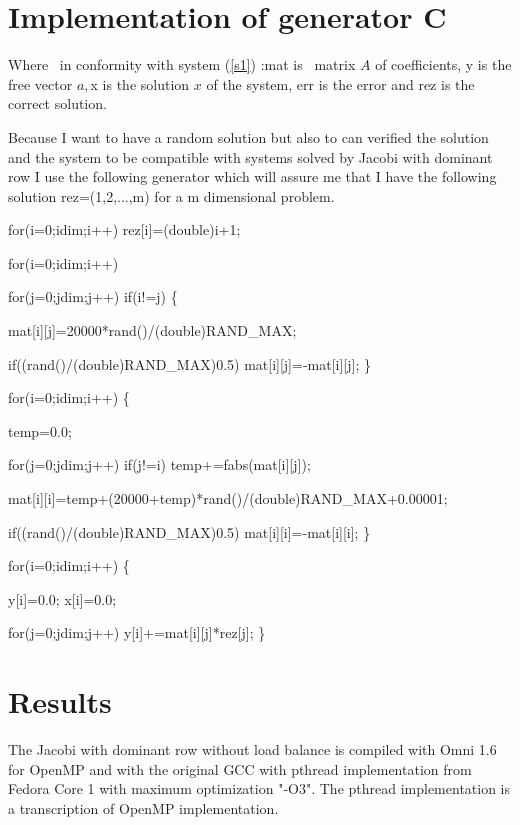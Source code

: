 \documentclass[a4paper]{article}
\begin{document}
\section{Implementation of generator C}

Where \ in conformity with system (\ref{s1}) :mat is \ matrix $A$ of
coefficients, y is the free vector $a,$x is the solution $x$ of the system,
err is the error and rez is the correct solution.

Because I want to have a random solution but also to can verified the
solution and the system to be compatible with systems solved by Jacobi with
dominant row I use the following generator which will assure me that I have
the following solution rez=(1,2,...,m) for a m dimensional problem.

{\small \qquad for(i=0;i\TEXTsymbol{<}dim;i++) rez[i]=(double)i+1;}

{\small \qquad for(i=0;i\TEXTsymbol{<}dim;i++)}

{\small \qquad \qquad for(j=0;j\TEXTsymbol{<}dim;j++) if(i!=j) \{}

{\small \qquad \qquad \qquad \qquad mat[i][j]=20000*rand()/(double)RAND\_MAX;%
}

{\small \qquad \qquad \qquad \qquad if((rand()/(double)RAND\_MAX)\TEXTsymbol{%
<}0.5) mat[i][j]=-mat[i][j]; \}}

{\small \qquad for(i=0;i\TEXTsymbol{<}dim;i++) \{}

{\small \qquad \qquad temp=0.0;}

{\small \qquad \qquad for(j=0;j\TEXTsymbol{<}dim;j++) if(j!=i)
temp+=fabs(mat[i][j]);}

{\small \qquad \qquad
mat[i][i]=temp+(20000+temp)*rand()/(double)RAND\_MAX+0.00001;}

{\small \qquad \qquad if((rand()/(double)RAND\_MAX)\TEXTsymbol{<}0.5)
mat[i][i]=-mat[i][i]; \}}

{\small \qquad for(i=0;i\TEXTsymbol{<}dim;i++) \{}

{\small \qquad \qquad y[i]=0.0; x[i]=0.0;}

{\small \qquad \qquad for(j=0;j\TEXTsymbol{<}dim;j++)
y[i]+=mat[i][j]*rez[j]; \}}

\section{Results}

The Jacobi with dominant row without load balance is compiled with Omni 1.6
for OpenMP and with the original GCC with pthread implementation from Fedora
Core 1 with maximum optimization "-O3". The pthread implementation is a
transcription of OpenMP implementation.
\end{document}
